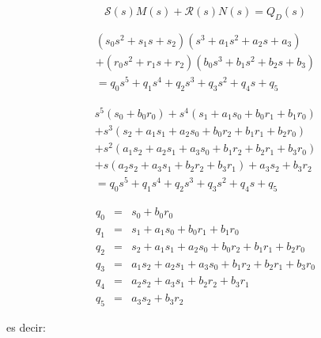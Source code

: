             \begin{equation*}
                \mathcal{S}(s) M(s) + \mathcal{R}(s) N(s) = Q_D(s)
            \end{equation*}

            \begin{multline*}
                (s_0 s^2 + s_1 s + s_2)(s^3 + a_1 s^2 + a_2 s + a_3) \\
                + (r_0 s^2 + r_1 s + r_2)(b_0 s^3 + b_1 s^2 + b_2 s + b_3) \\
                = q_0 s^5 + q_1 s^4 + q_2 s^3 + q_3 s^2 + q_4 s + q_5
            \end{multline*}

            \begin{multline*}
                s^{5} \left( s_{0} + b_{0} r_{0} \right) + s^{4} \left( s_{1} + a_{1} s_{0} + b_{0} r_{1} + b_{1} r_{0} \right) \\
                + s^{3} \left( s_{2} + a_{1} s_{1} + a_{2} s_{0} + b_{0} r_{2} + b_{1} r_{1} + b_{2} r_{0} \right) \\
                + s^{2} \left( a_{1} s_{2} + a_{2} s_{1} + a_{3} s_{0} + b_{1} r_{2} + b_{2} r_{1} + b_{3} r_{0} \right) \\
                + s \left( a_{2} s_{2} + a_{3} s_{1} + b_{2} r_{2} + b_{3} r_{1} \right) + a_{3} s_{2} + b_{3} r_{2}\\
                = q_0 s^5 + q_1 s^4 + q_2 s^3 + q_3 s^2 + q_4 s + q_5
            \end{multline*}

            \begin{eqnarray*}
                q_0 & = & s_{0} + b_{0} r_{0} \\
                q_1 & = & s_{1} + a_{1} s_{0} + b_{0} r_{1} + b_{1} r_{0} \\
                q_2 & = & s_{2} + a_{1} s_{1} + a_{2} s_{0} + b_{0} r_{2} + b_{1} r_{1} + b_{2} r_{0} \\
                q_3 & = & a_{1} s_{2} + a_{2} s_{1} + a_{3} s_{0} + b_{1} r_{2} + b_{2} r_{1} + b_{3} r_{0} \\
                q_4 & = & a_{2} s_{2} + a_{3} s_{1} + b_{2} r_{2} + b_{3} r_{1} \\
                q_5 & = & a_{3} s_{2} + b_{3} r_{2}
            \end{eqnarray*}

            es decir:


